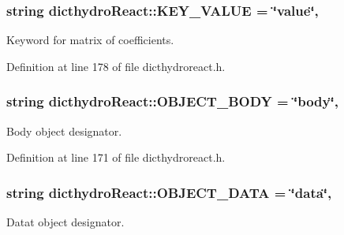 \hypertarget{classosea_1_1dicthydro_react_acee862a95117a816d7fd3c634f935a85}{
\subsubsection[{K\-E\-Y\-\_\-\-V\-A\-L\-U\-E}]{\setlength{\rightskip}{0pt plus 5cm}string dicthydro\-React\-::\-K\-E\-Y\-\_\-\-V\-A\-L\-U\-E = \char`\"{}value\char`\"{}\hspace{0.3cm}{\ttfamily [static]}, {\ttfamily [protected]}}}\label{classosea_1_1dicthydro_react_acee862a95117a816d7fd3c634f935a85}
Keyword for matrix of coefficients. 

Definition at line 178 of file dicthydroreact.\-h.

\hypertarget{classosea_1_1dicthydro_react_a29b13546ba418a88b771796696433955}{
\subsubsection[{O\-B\-J\-E\-C\-T\-\_\-\-B\-O\-D\-Y}]{\setlength{\rightskip}{0pt plus 5cm}string dicthydro\-React\-::\-O\-B\-J\-E\-C\-T\-\_\-\-B\-O\-D\-Y = \char`\"{}body\char`\"{}\hspace{0.3cm}{\ttfamily [static]}, {\ttfamily [protected]}}}\label{classosea_1_1dicthydro_react_a29b13546ba418a88b771796696433955}
Body object designator. 

Definition at line 171 of file dicthydroreact.\-h.

\hypertarget{classosea_1_1dicthydro_react_aadf52b76941055136df1d8c74aa67077}{
\subsubsection[{O\-B\-J\-E\-C\-T\-\_\-\-D\-A\-T\-A}]{\setlength{\rightskip}{0pt plus 5cm}string dicthydro\-React\-::\-O\-B\-J\-E\-C\-T\-\_\-\-D\-A\-T\-A = \char`\"{}data\char`\"{}\hspace{0.3cm}{\ttfamily [static]}, {\ttfamily [protected]}}}\label{classosea_1_1dicthydro_react_aadf52b76941055136df1d8c74aa67077}
Datat object designator. 

